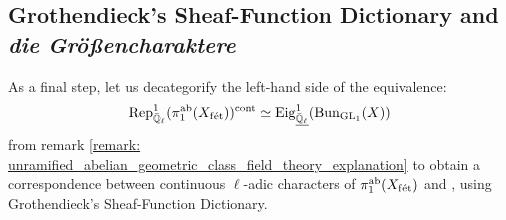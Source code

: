     \subsection{Grothendieck's Sheaf-Function Dictionary and \textit{die Gr\"o{\ss}encharaktere}}
        As a final step, let us decategorify the left-hand side of the equivalence:
            $$\mathrm{Rep}_{\bar{\mathbb{Q}}_{\ell}}^1(\pi_1^{\mathrm{ab}}(X_{\mathrm{f\acute{e}t}}))^{\mathrm{cont}} \simeq \mathrm{Eig}_{\underline{\bar{\mathbb{Q}}_{\ell}}}^1(\mathrm{Bun}_{\operatorname{GL}_1}(X))$$
        from remark \ref{remark: unramified_abelian_geometric_class_field_theory_explanation} to obtain a correspondence between continuous $\ell$-adic characters of $\pi_1^{\mathrm{ab}}(X_{\mathrm{f\acute{e}t}})$ and , using Grothendieck's Sheaf-Function Dictionary.